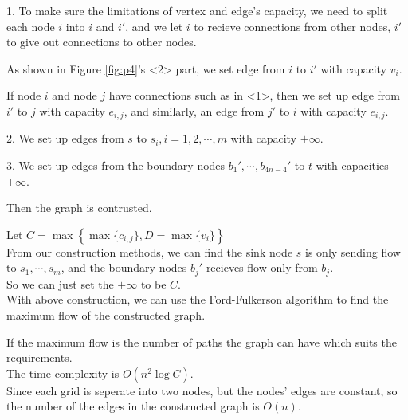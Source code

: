 1. To make sure the limitations of vertex and edge's capacity, we need to split each node $i$ into $i$ and $i'$, and we let $i$ to recieve connections from other nodes, $i'$ to give out connections to other nodes.

As shown in Figure \ref{fig:p4}'s <2> part, we set edge from $i$ to $i'$ with capacity $v_i$.

If node $i$ and node $j$ have connections such as in <1>, then we set up edge from $i'$ to $j$ with capacity $e_{i,j}$, and similarly, an edge from $j'$ to $i$ with capacity $e_{i,j}$.

2. We set up edges from $s$ to $s_i, i=1,2,\cdots,m$ with capacity $+\infty$.

3. We set up edges from the boundary nodes $b_1',\cdots,b_{4n-4}'$ to $t$ with capacities $+\infty$.

Then the graph is contrusted.

Let $C=\max\left\{\max\{c_{i,j}\},D=\max\{v_i\}\right\}$\\
From our construction methods, we can find the sink node $s$ is only sending flow to $s_1,\cdots,s_m$, 
and the boundary nodes $b_j'$ recieves flow only from $b_j$.\\
So we can just set the $+\infty$ to be $C$.\\

With above construction, we can use the Ford-Fulkerson algorithm to find the maximum flow of the constructed graph. 

If the maximum flow is the number of paths the graph can have which suits the requirements.\\
The time complexity is $O(n^2\log C)$.\\
Since each grid is seperate into two nodes, but the nodes' edges are constant, so the number of the edges in the constructed graph is $O(n)$.\\

\newpage